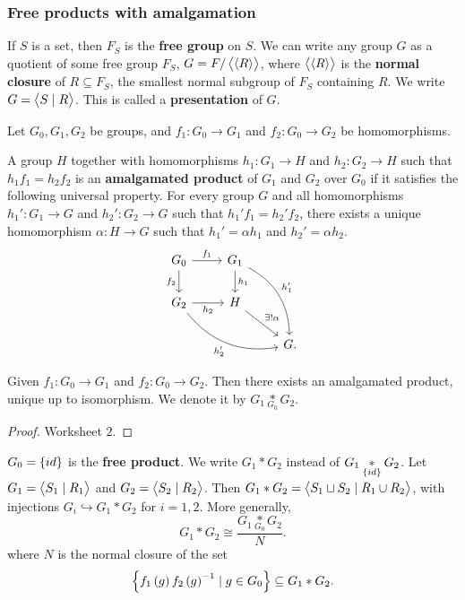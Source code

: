 \subsubsection{Free products with amalgamation}

\begin{definition*}
If $ S $ is a set, then $ F_S $ is the \textbf{free group} on $ S $. We can write any group $ G $ as a quotient of some free group $ F_S $, $ G = F / \left\langle \left\langle R \right\rangle \right\rangle $, where $ \left\langle \left\langle R \right\rangle \right\rangle $ is the \textbf{normal closure} of $ R \subseteq F_S $, the smallest normal subgroup of $ F_S $ containing $ R $. We write $ G = \left\langle S \mid R \right\rangle $. This is called a \textbf{presentation} of $ G $.
\end{definition*}

Let $ G_0, G_1, G_2 $ be groups, and $ f_1 : G_0 \to G_1 $ and $ f_2 : G_0 \to G_2 $ be homomorphisms.

\begin{definition*}
A group $ H $ together with homomorphisms $ h_1 : G_1 \to H $ and $ h_2 : G_2 \to H $ such that $ h_1f_1 = h_2f_2 $ is an \textbf{amalgamated product} of $ G_1 $ and $ G_2 $ over $ G_0 $ if it satisfies the following universal property. For every group $ G $ and all homomorphisms $ h_1' : G_1 \to G $ and $ h_2' : G_2 \to G $ such that $ h_1'f_1 = h_2'f_2 $, there exists a unique homomorphism $ \alpha : H \to G $ such that $ h_1' = \alpha h_1 $ and $ h_2' = \alpha h_2 $.
$$
\begin{tikzcd}
G_0 \arrow{r}{f_1} \arrow[swap]{d}{f_2} & G_1 \arrow{d}{h_1} \arrow[bend left=30]{ddr}{h_1'} & \\
G_2 \arrow[swap]{r}{h_2} \arrow[bend right=30, swap]{drr}{h_2'} & H \arrow{dr}{\exists !\alpha} & \\
& & G.
\end{tikzcd}
$$
\end{definition*}

\begin{theorem}
Given $ f_1 : G_0 \to G_1 $ and $ f_2 : G_0 \to G_2 $. Then there exists an amalgamated product, unique up to isomorphism. We denote it by
$ G_1 \underset{G_0}{*} G_2 $.
\end{theorem}

\begin{proof}
Worksheet $ 2 $.
\end{proof}


$ G_0 = \cbr{id} $ is the \textbf{free product}. We write $ G_1 * G_2 $ instead of $ G_1 \underset{\cbr{id}}{*} G_2 $. Let $ G_1 = \left\langle S_1 \mid R_1 \right\rangle $ and $ G_2 = \left\langle S_2 \mid R_2 \right\rangle $. Then $ G_1 * G_2 = \left\langle S_1 \sqcup S_2 \mid R_1 \cup R_2 \right\rangle $, with injections $ G_i \hookrightarrow G_1 * G_2 $ for $ i = 1, 2 $. More generally,
$$ G_1 * G_2 \cong \dfrac{G_1 \underset{G_0}{*} G_2}{N}. $$
where $ N $ is the normal closure of the set
$$ \cbr{f_1\br{g}f_2\br{g}^{-1} \mid g \in G_0} \subseteq G_1 * G_2. $$

